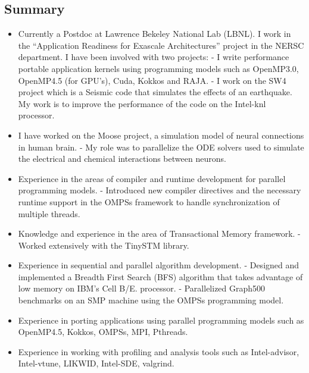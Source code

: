 \documentclass[margin]{res}
\begin{document}
%
\address{
skype\ :\ rahulkumar.gayatri\\
email\ :\ rahulgayatri84@gmail.com\\
phone-number\ :\ 19253848354
}

\begin{resume}
%
  \section{Summary}
  \begin{itemize}
%
      \item Currently a Postdoc at Lawrence Bekeley National Lab (LBNL). I work in the \enquote{Application Readiness for Exascale Architectures} project in the NERSC department.
          I have been involved with two projects:
        \subitem - I write performance portable application kernels using programming models such as OpenMP3.0, OpenMP4.5 (for GPU's), Cuda, Kokkos and RAJA.
        \subitem - I work on the SW4 project which is a Seismic code that simulates the effects of an earthquake.
        My work is to improve the performance of the code on the Intel-knl processor.
%
	   \item I have worked on the Moose project, a simulation model of neural connections in human brain.
			 \subitem - My role was to parallelize the ODE solvers used to simulate the electrical and chemical interactions between neurons.
%
	   \item Experience in the areas of compiler and runtime development for parallel programming models.
			 \subitem - Introduced new compiler directives and the necessary runtime support in the OMPSs framework to handle synchronization of multiple threads.
%
	   \item Knowledge and experience in the area of Transactional Memory framework.
			 \subitem - Worked extensively with the TinySTM library.
%
	   \item  Experience in sequential and parallel algorithm development.
			 \subitem  - Designed and implemented a Breadth First Search (BFS) algorithm that takes advantage of low memory on IBM's Cell B/E. processor.
			 \subitem  - Parallelized Graph500 benchmarks on an SMP machine using the OMPSs programming model.
%
	   \item Experience in porting applications using parallel programming models such as OpenMP4.5, Kokkos, OMPSs, MPI, Pthreads.
%
%
	   \item Experience in working with profiling and analysis tools such as Intel-advisor, Intel-vtune, LIKWID, Intel-SDE, valgrind.
%
  \end{itemize}


\end{resume}
\end{document}

